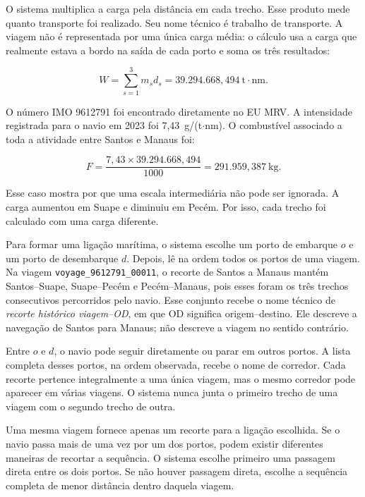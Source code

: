 \documentclass[12pt,a4paper]{article}
\begin{document}
O sistema multiplica a carga pela distância em cada trecho. Esse produto mede quanto transporte foi realizado. Seu nome técnico é trabalho de transporte. A viagem não é representada por uma única carga média: o cálculo usa a carga que realmente estava a bordo na saída de cada porto e soma os três resultados:

\begin{equation}
W=\sum_{s=1}^{3}m_s d_s
=39.294.668{,}494~\mathrm{t{\cdot}nm}.
\label{eq:exemplo-trabalho}
\end{equation}

O número IMO 9612791 foi encontrado diretamente no EU MRV. A intensidade registrada para o navio em 2023 foi 7,43~g/(t$\cdot$nm). O combustível associado a toda a atividade entre Santos e Manaus foi:

\begin{equation}
F=\frac{7{,}43\times39.294.668{,}494}{1000}=291.959{,}387~\mathrm{kg}.
\label{eq:exemplo-combustivel}
\end{equation}

Esse caso mostra por que uma escala intermediária não pode ser ignorada. A carga aumentou em Suape e diminuiu em Pecém. Por isso, cada trecho foi calculado com uma carga diferente.

Para formar uma ligação marítima, o sistema escolhe um porto de embarque $o$ e um porto de desembarque $d$. Depois, lê na ordem todos os portos de uma viagem. Na viagem \texttt{voyage\_9612791\_00011}, o recorte de Santos a Manaus mantém Santos--Suape, Suape--Pecém e Pecém--Manaus, pois esses foram os três trechos consecutivos percorridos pelo navio. Esse conjunto recebe o nome técnico de \emph{recorte histórico viagem--OD}, em que OD significa origem--destino. Ele descreve a navegação de Santos para Manaus; não descreve a viagem no sentido contrário.

Entre $o$ e $d$, o navio pode seguir diretamente ou parar em outros portos. A lista completa desses portos, na ordem observada, recebe o nome de corredor. Cada recorte pertence integralmente a uma única viagem, mas o mesmo corredor pode aparecer em várias viagens. O sistema nunca junta o primeiro trecho de uma viagem com o segundo trecho de outra.

Uma mesma viagem fornece apenas um recorte para a ligação escolhida. Se o navio passa mais de uma vez por um dos portos, podem existir diferentes maneiras de recortar a sequência. O sistema escolhe primeiro uma passagem direta entre os dois portos. Se não houver passagem direta, escolhe a sequência completa de menor distância dentro daquela viagem.
\end{document}
